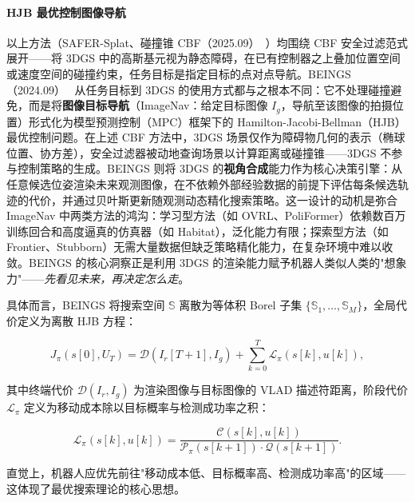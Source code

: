 \paragraph{HJB 最优控制图像导航}

以上方法（SAFER-Splat、碰撞锥 CBF（2025.09）~\cite{2509_14421}）均围绕 CBF 安全过滤范式展开——将 3DGS 中的高斯基元视为静态障碍，在已有控制器之上叠加位置空间或速度空间的碰撞约束，任务目标是指定目标的点对点导航。BEINGS（2024.09）~\cite{2409_10216} 从任务目标到 3DGS 的使用方式都与之根本不同：它不处理碰撞避免，而是将\textbf{图像目标导航}（ImageNav：给定目标图像 $I_g$，导航至该图像的拍摄位置）形式化为模型预测控制（MPC）框架下的 Hamilton-Jacobi-Bellman（HJB）最优控制问题。在上述 CBF 方法中，3DGS 场景仅作为障碍物几何的表示（椭球位置、协方差），安全过滤器被动地查询场景以计算距离或碰撞锥——3DGS 不参与控制策略的生成。BEINGS 则将 3DGS 的\textbf{视角合成}能力作为核心决策引擎：从任意候选位姿渲染未来观测图像，在不依赖外部经验数据的前提下评估每条候选轨迹的代价，并通过贝叶斯更新随观测动态精化搜索策略。这一设计的动机是弥合 ImageNav 中两类方法的鸿沟：学习型方法（如 OVRL、PoliFormer）依赖数百万训练回合和高度逼真的仿真器（如 Habitat），泛化能力有限；探索型方法（如 Frontier、Stubborn）无需大量数据但缺乏策略精化能力，在复杂环境中难以收敛。BEINGS 的核心洞察正是利用 3DGS 的渲染能力赋予机器人类似人类的"想象力"——\emph{先看见未来，再决定怎么走}。

具体而言，BEINGS 将搜索空间 $\mathbb{S}$ 离散为等体积 Borel 子集 $\{\mathbb{S}_1, \dots, \mathbb{S}_M\}$，全局代价定义为离散 HJB 方程：

\begin{equation}
    J_\pi(s[0], U_T) = \mathcal{D}(I_r[T\!+\!1], I_g) + \sum_{k=0}^{T} \mathcal{L}_\pi(s[k], u[k]),
\end{equation}

其中终端代价 $\mathcal{D}(I_r, I_g)$ 为渲染图像与目标图像的 VLAD 描述符距离，阶段代价 $\mathcal{L}_\pi$ 定义为移动成本除以目标概率与检测成功率之积：

\begin{equation}
    \mathcal{L}_\pi(s[k], u[k]) = \frac{\mathcal{C}(s[k], u[k])}{\mathcal{P}_\pi(s[k\!+\!1]) \cdot \mathcal{Q}(s[k\!+\!1])}.
\end{equation}

直觉上，机器人应优先前往"移动成本低、目标概率高、检测成功率高"的区域——这体现了最优搜索理论的核心思想。

